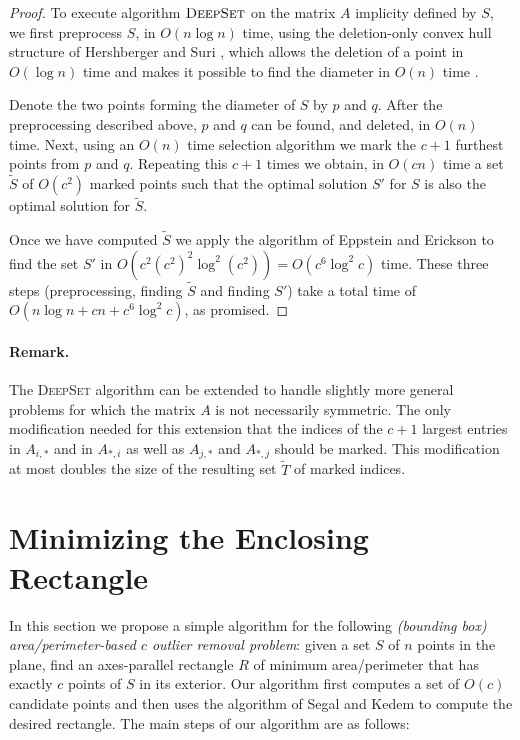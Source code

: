 \documentclass[lotsofwhite]{patmorin}
\begin{document}
\begin{proof}
To execute algorithm $\textsc{DeepSet}$ on the matrix $A$ implicity
defined by $S$, we first preprocess $S$, in $O(n\log n)$ time, using
the deletion-only convex hull structure of Hershberger and Suri
\cite{hs92}, which allows the deletion of a point in $O(\log n)$ time
and makes it possible to find the diameter in $O(n)$ time \cite{s78}.

Denote the two points forming the diameter of $S$ by $p$ and $q$.
After the preprocessing described above, $p$ and $q$ can be found, and
deleted, in $O(n)$ time.  Next, using an $O(n)$ time selection
algorithm we mark the $c+1$ furthest points from $p$ and $q$.
Repeating this $c+1$ times we obtain, in $O(cn)$ time a set
$\tilde{S}$ of $O(c^2)$ marked points such that the optimal solution
$S'$ for $S$ is also the optimal solution for $\tilde{S}$.

Once we have computed $\tilde{S}$ we apply the algorithm of Eppstein
and Erickson \cite{ee94} to find the set $S'$ in $O(c^2 (c^2)^2\log^2
(c^2)) = O(c^6\log^2 c)$ time.  These three steps (preprocessing,
finding $\tilde{S}$ and finding $S'$) take a total time of $O(n\log n
+ cn + c^6 \log^2 c)$, as promised.
\end{proof}

\paragraph{Remark.} The \textsc{DeepSet} algorithm can be extended to
handle slightly more general problems for which the matrix $A$ is not
necessarily symmetric.  The only modification needed for this
extension that the indices of the $c+1$ largest entries in $A_{i,*}$
and in $A_{*,i}$ as well as $A_{j,*}$ and $A_{*,j}$ should be marked.
This modification at most doubles the size of the resulting set
$\tilde{T}$ of marked indices.

\section{Minimizing the Enclosing Rectangle}

In this section we propose a simple algorithm for the following
\emph{(bounding box) area/perimeter-based $c$ outlier removal problem}:
given a set $S$ of $n$ points in the plane, find an axes-parallel
rectangle $R$ of minimum area/perimeter that has exactly $c$ points of
$S$ in its exterior.  Our algorithm first computes a set of $O(c)$
candidate points and then uses the algorithm of Segal and Kedem
\cite{sk98} to compute the desired rectangle.  The main steps of our
algorithm are as follows:
\end{document}
